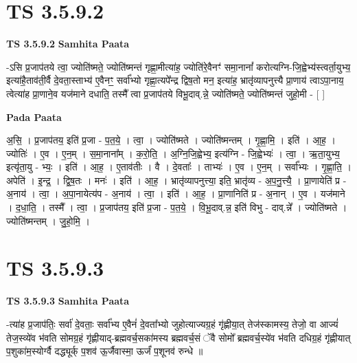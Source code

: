 \documentclass[17pt]{extarticle}
\begin{document}
\section*{ TS 3.5.9.2 }

\textbf{TS 3.5.9.2 } \newline
\textbf{Samhita Paata} \newline

-ऽसि प्र॒जाप॑तये त्वा॒ ज्योति॑ष्मते॒ ज्योति॑ष्मन्तं गृह्णा॒मीत्या॑ह॒ ज्योति॑रे॒वैनꣳ॑ समा॒नानां᳚ करोत्यग्नि-जि॒ह्वेभ्य॑स्त्वर्ता॒युभ्य॒ इत्या॑है॒ताव॑ती॒र्वै दे॒वता॒स्ताभ्य॑ ए॒वैनꣳ॒॒ सर्वा᳚भ्यो गृह्णा॒त्यपे᳚न्द्र द्विष॒तो मन॒ इत्या॑ह॒ भ्रातृ॑व्यापनुत्त्यै प्रा॒णाय॑ त्वाऽपा॒नाय॒ त्वेत्या॑ह प्रा॒णाने॒व यज॑माने दधाति॒ तस्मै᳚ त्वा प्र॒जाप॑तये विभू॒दाव्.न्ने॒ ज्योति॑ष्मते॒ ज्योति॑ष्मन्तं जुहो॒मी - [  ] \newline

\textbf{Pada Paata} \newline

अ॒सि॒ । प्र॒जाप॑तय॒ इति॑ प्र॒जा - प॒त॒ये॒ । त्वा॒ । ज्योति॑ष्मते । ज्योति॑ष्मन्तम् । गृ॒ह्णा॒मि॒ । इति॑ । आ॒ह॒ । ज्योतिः॑ । ए॒व । ए॒न॒म् । स॒मा॒नाना᳚म् । क॒रो॒ति॒ । अ॒ग्नि॒जि॒ह्वेभ्य॒ इत्य॑ग्नि - जि॒ह्वेभ्यः॑ । त्वा॒ । ऋ॒ता॒युभ्य॒ इत्यृ॑ता॒यु - भ्यः॒ । इति॑ । आ॒ह॒ । ए॒ताव॑तीः । वै । दे॒वताः᳚ । ताभ्यः॑ । ए॒व । ए॒न॒म् । सर्वा᳚भ्यः । गृ॒ह्णा॒ति॒ । अपेति॑ । इ॒न्द्र॒ । द्वि॒ष॒तः । मनः॑ । इति॑ । आ॒ह॒ । भ्रातृ॑व्यापनुत्त्या॒ इति॒ भ्रातृ॑व्य - अ॒प॒नु॒त्त्यै॒ । प्रा॒णायेति॑ प्र - अ॒नाय॑ । त्वा॒ । अ॒पा॒नायेत्य॑प - अ॒नाय॑ । त्वा॒ । इति॑ । आ॒ह॒ । प्रा॒णानिति॑ प्र - अ॒नान् । ए॒व । यज॑माने । द॒धा॒ति॒ । तस्मै᳚ । त्वा॒ । प्र॒जाप॑तय॒ इति॑ प्र॒जा - प॒त॒ये॒ । वि॒भू॒दाव्.न्न॒ इति॑ विभु - दाव्.न्ने᳚ । ज्योति॑ष्मते । ज्योति॑ष्मन्तम् । जु॒हो॒मि॒ ।  \newline




\section*{ TS 3.5.9.3 }

\textbf{TS 3.5.9.3 } \newline
\textbf{Samhita Paata} \newline

-त्या॑ह प्र॒जाप॑तिः॒ सर्वा॑ दे॒वताः॒ सर्वा᳚भ्य ए॒वैनं॑ दे॒वता᳚भ्यो जुहोत्याज्यग्र॒हं गृ॑ह्णीया॒त् तेज॑स्कामस्य॒ तेजो॒ वा आज्यं॑ तेज॒स्व्ये॑व भ॑वति सोमग्र॒हं गृ॑ह्णीयाद्-ब्रह्मवर्च॒सका॑मस्य ब्रह्मवर्च॒सं ॅवै सोमो᳚ ब्रह्मवर्च॒स्ये॑व भ॑वति दधिग्र॒हं गृ॑ह्णीयात् प॒शुका॑म॒स्योर्ग्वै दद्ध्यूर्क् प॒शव॑ ऊ॒र्जैवास्मा॒ ऊर्जं॑ प॒शूनव॑ रुन्धे ॥ \newline
\end{document}
